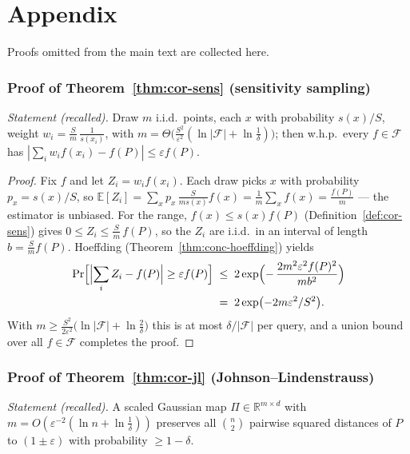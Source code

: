 \section{Appendix}
\label{sec:cor-appendix}

Proofs omitted from the main text are collected here.

\subsubsection*{Proof of Theorem~\ref{thm:cor-sens} (sensitivity sampling)}
{\itshape Statement (recalled).} Draw $m$ i.i.d.\ points, each $x$ with
probability $s(x)/S$, weight $w_i = \tfrac{S}{m}\,\tfrac{1}{s(x_i)}$,
with $m = \Theta\bigl(\tfrac{S^2}{\varepsilon^2}(\ln|\mathcal{F}| +
\ln\tfrac1\delta)\bigr)$; then w.h.p.\ every $f \in \mathcal{F}$ has
$|\sum_i w_i f(x_i) - f(P)| \le \varepsilon f(P)$.\eop

\begin{proof}
Fix $f$ and let $Z_i = w_i f(x_i)$. Each draw picks $x$ with
probability $p_x = s(x)/S$, so $\mathbb{E}[Z_i] = \sum_x
p_x\,\tfrac{S}{m s(x)} f(x) = \tfrac{1}{m}\sum_x f(x) =
\tfrac{f(P)}{m}$ --- the estimator is unbiased. For the range, $f(x)
\le s(x) f(P)$ (Definition~\ref{def:cor-sens}) gives $0 \le Z_i \le
\tfrac{S}{m}\,f(P)$, so the $Z_i$ are i.i.d.\ in an interval of length
$b = \tfrac{S}{m}f(P)$. Hoeffding (Theorem~\ref{thm:conc-hoeffding})
yields
\begin{align*}
\Pr\Bigl[\Bigl|\sum_i Z_i - f(P)\Bigr| \ge \varepsilon f(P)\Bigr]
&\;\le\; 2\exp\Bigl(-\,\frac{2m^2\varepsilon^2 f(P)^2}{m b^2}\Bigr)\\
&\;=\; 2\exp\bigl(-2m\varepsilon^2/S^2\bigr).
\end{align*}
With $m \ge \tfrac{S^2}{2\varepsilon^2}\bigl(\ln|\mathcal{F}| +
\ln\tfrac{2}{\delta}\bigr)$ this is at most $\delta/|\mathcal{F}|$ per
query, and a union bound over all $f \in \mathcal{F}$ completes the
proof.
\end{proof}

\subsubsection*{Proof of Theorem~\ref{thm:cor-jl} (Johnson--Lindenstrauss)}
{\itshape Statement (recalled).} A scaled Gaussian map $\Pi \in
\mathbb{R}^{m\times d}$ with $m = O(\varepsilon^{-2}(\ln n +
\ln\tfrac1\delta))$ preserves all $\binom{n}{2}$ pairwise squared
distances of $P$ to $(1\pm\varepsilon)$ with probability $\ge
1-\delta$.\eop

